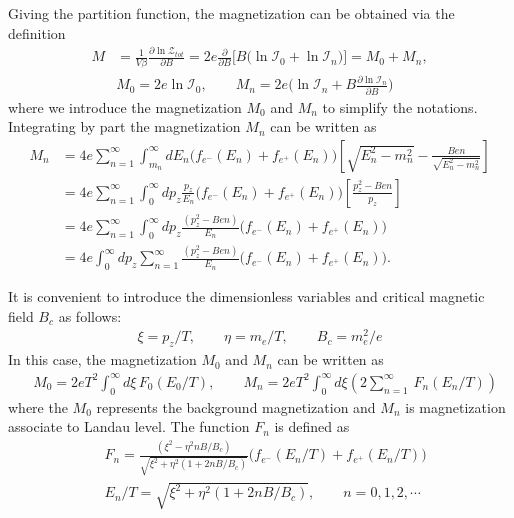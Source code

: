 \documentclass[sn-mathphys,Numbered]{sn-jnl}
\begin{document}
Giving the partition function, the magnetization can be obtained via the definition
\begin{align}
M&=\frac{1}{V\beta}\frac{\partial \ln \mathcal{Z}_{tot}}{\partial B}=2e\frac{\partial}{\partial B}\bigg[B\bigg(\ln\mathcal{I}_{0}+\ln\mathcal{I}_{n}\bigg)\bigg]=M_0+M_n,\\
&M_0=2e\ln\mathcal{I}_{0},\qquad
\label{M_landau}
M_n=2e\bigg(\ln\mathcal{I}_{n}+B\frac{\partial\ln\mathcal{I}_n}{\partial B}\bigg)
\end{align}
where we introduce the magnetization $M_0$ and $M_n$ to simplify the notations. 
Integrating by part the magnetization $M_n$ can be written as
\begin{align}
M_n&=4e\sum_{n=1}^\infty \int_{m_n}^\infty\!\!dE_n\bigg(f_{e^-}(E_n)+f_{e^+}(E_n)\bigg)\left[{\sqrt{E^2_n-m^2_n}}-\frac{Ben}{\sqrt{E^2_n-m^2_n}}\right]\\
&=4e\sum_{n=1}^\infty \int_{0}^\infty\!\!dp_z\frac{p_z}{E_n}\bigg(f_{e^-}(E_n)+f_{e^+}(E_n)\bigg)\left[\frac{p_z^2-Ben}{p_z}\right]\\
&=4e\sum_{n=1}^\infty \int_{0}^\infty\!\!dp_z\frac{(p_z^2-Ben)}{E_n}\bigg(f_{e^-}(E_n)+f_{e^+}(E_n)\bigg)\\
&=4e \int_{0}^\infty\!\!dp_z\sum_{n=1}^\infty\frac{(p_z^2-Ben)}{E_n}\bigg(f_{e^-}(E_n)+f_{e^+}(E_n)\bigg).
\end{align}


It is convenient to introduce the dimensionless variables and critical magnetic field $B_c$ as follows:
\begin{align}
\xi=p_z/T,\qquad \eta=m_e/T,\qquad B_c=m^2_e/e
\end{align}
In this case, the magnetization $M_0$ and $M_n$ can be written as
\begin{align}
&M_0=2eT^2\int_0^\infty\!\!d\xi\, F_0(E_0/T),\qquad M_n=2eT^2\int_{0}^\infty\!\!d\xi\left(2\sum_{n=1}^\infty\,F_n(E_n/T)\right)
\end{align}
where the $M_0$ represents the background magnetization  and $M_n$ is magnetization associate to Landau level. The function $F_n$ is defined as
\begin{align}
&F_n=\frac{(\xi^2-\eta^2nB/B_c)}{\sqrt{\xi^2+\eta^2\left(1+2nB/B_c\right)}}\bigg(f_{e^-}(E_n/T)+f_{e^+}(E_n/T)\bigg)\\
&E_n/T=\sqrt{\xi^2+\eta^2\left(1+2nB/B_c\right)},\qquad n=0,1,2,\cdots
\end{align}
\end{document}

